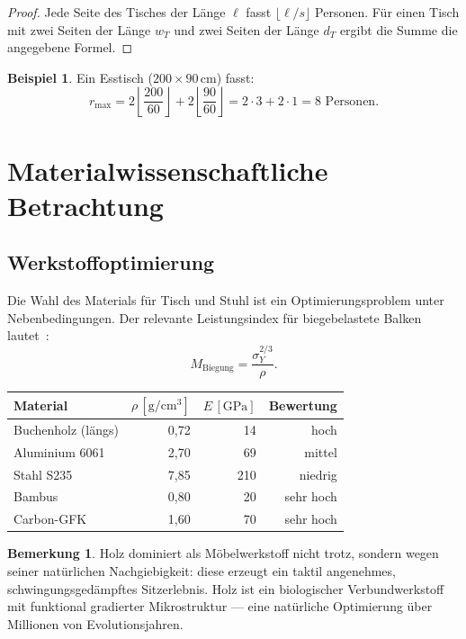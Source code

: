 \documentclass[a4paper,12pt]{article}
\theoremstyle{definition}
\newtheorem{beispiel}{Beispiel}
\newtheorem{bemerkung}{Bemerkung}
\begin{document}
\begin{proof}
	Jede Seite des Tisches der L\"{a}nge $\ell$ fasst $\lfloor \ell / s \rfloor$ Personen.
	F\"{u}r einen Tisch mit zwei Seiten der L\"{a}nge $w_T$ und zwei Seiten der L\"{a}nge $d_T$
	ergibt die Summe die angegebene Formel.
\end{proof}

\begin{beispiel}
	Ein Esstisch ($200 \times 90\,\mathrm{cm}$) fasst:
	\[
		r_{\max} = 2 \left\lfloor \frac{200}{60} \right\rfloor
		+ 2 \left\lfloor \frac{90}{60} \right\rfloor
		= 2 \cdot 3 + 2 \cdot 1 = 8 \text{ Personen.}
	\]
\end{beispiel}

\section{Materialwissenschaftliche Betrachtung}

\subsection{Werkstoffoptimierung}

Die Wahl des Materials f\"{u}r Tisch und Stuhl ist ein Optimierungsproblem unter
Nebenbedingungen. Der relevante Leistungsindex f\"{u}r biegebelastete Balken lautet~\cite{AshbyMF2011}:
\[
	M_{\mathrm{Biegung}} = \frac{\sigma_Y^{2/3}}{\rho}.
\]

\begin{center}
\begin{tabular}{lrrr}
\hline
\textbf{Material} & $\rho\,[\mathrm{g/cm^3}]$ & $E\,[\mathrm{GPa}]$ & Bewertung \\
\hline
Buchenholz (l\"{a}ngs) & 0{,}72 & 14 & hoch \\
Aluminium 6061 & 2{,}70 & 69 & mittel \\
Stahl S235 & 7{,}85 & 210 & niedrig \\
Bambus & 0{,}80 & 20 & sehr hoch \\
Carbon-GFK & 1{,}60 & 70 & sehr hoch \\
\hline
\end{tabular}
\end{center}

\begin{bemerkung}
	Holz dominiert als M\"{o}belwerkstoff nicht trotz, sondern wegen seiner nat\"{u}rlichen
	Nachgiebigkeit: diese erzeugt ein taktil angenehmes, schwingungsged\"{a}mpftes
	Sitzerlebnis. Holz ist ein biologischer Verbundwerkstoff mit funktional gradierter
	Mikrostruktur --- eine nat\"{u}rliche Optimierung \"{u}ber Millionen von Evolutionsjahren.
\end{bemerkung}
\end{document}
